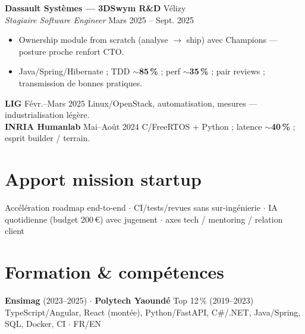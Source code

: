 \documentclass[10pt,a4paper]{article}
\begin{document}
\textbf{Dassault Syst\`emes --- 3DSwym R\&D} \hfill V\'elizy\\
\textit{Stagiaire Software Engineer} \hfill Mars 2025 -- Sept. 2025
\begin{itemize}
  \item Ownership module from scratch (analyse $\rightarrow$ ship) avec Champions --- posture proche renfort CTO.
  \item Java/Spring/Hibernate ; TDD $\sim$\textbf{85\,\%} ; perf $\sim$\textbf{35\,\%} ; pair reviews ; transmission de bonnes pratiques.
\end{itemize}

\textbf{LIG} \hfill F\'evr.--Mars 2025 \quad Linux/OpenStack, automatisation, mesures --- industrialisation l\'eg\`ere.\\[1pt]
\textbf{INRIA Humanlab} \hfill Mai--Ao\^ut 2024 \quad C/FreeRTOS + Python ; latence $\sim$\textbf{40\,\%} ; esprit builder / terrain.

\section{Apport mission startup}
Acc\'el\'eration roadmap end-to-end $\cdot$ CI/tests/revues sans sur-ing\'enierie $\cdot$ IA quotidienne (budget 200\,€) avec jugement $\cdot$ axes tech / mentoring / relation client

\section{Formation \& comp\'etences}
\textbf{Ensimag} (2023--2025) $\cdot$ \textbf{Polytech Yaound\'e} Top 12\,\% (2019--2023)\\
TypeScript/Angular, React (mont\'ee), Python/FastAPI, C\#/.NET, Java/Spring, SQL, Docker, CI $\cdot$ FR/EN
\end{document}
